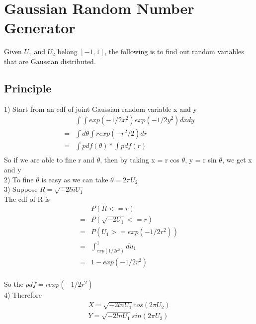 \documentclass[a4paper]{article}
\begin{document}
\section{Gaussian Random Number Generator}
Given $U_1$ and $U_2$ belong $[-1,1]$, the following is to find out random variables that are Gaussian distributed.\\
\subsection{Principle}
1)	Start from an cdf of joint Gaussian random variable x and y\\
\begin{align*}
& \int \int exp(-1/2 x^2)  exp(-1/2 y^2)  dx dy \\
 = & \int d \theta \int r exp(-r^2/2) dr\\
 = & \int pdf(\theta) * \int pdf(r)\\
\end{align*}
So if we are able to fine r and $\theta$, then by taking x = r cos $\theta$, y = r sin $\theta$, we get x and y\\
2)	To fine $\theta$ is easy as we can take $\theta = 2 \pi U_2$\\
3)	Suppose $R = \sqrt{-2 ln U_1}$\\
The cdf of R is
\begin{align*}
& P(R <= r) \\
 = &P(\sqrt{-2 U_1} <= r) \\
 = &P(U_1 >= exp(-1/2 r^2)) \\
 = &\int_{exp(1/2r^2)}^1 du_1 \\
 = &1 - exp(-1/2 r^2)	\\
\end{align*}

So the $pdf = r exp(-1/2 r^2)$\\
4)	Therefore
\begin{align*}
X = \sqrt{-2 ln U_1} cos(2\pi U_2) \\
Y = \sqrt{-2 ln U_1} sin(2\pi U_2) \\
\end{align*}
\end{document}
